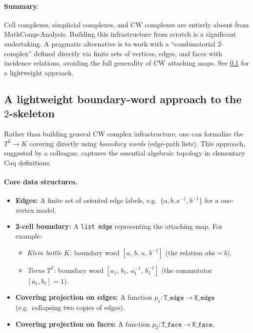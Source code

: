 \documentclass[11pt,a4paper]{article}
\theoremstyle{definition}
\theoremstyle{remark}
\begin{document}
\paragraph{Summary.}
Cell complexes, simplicial complexes, and CW complexes are entirely absent from MathComp-Analysis. Building this infrastructure from scratch is a significant undertaking. A pragmatic alternative is to work with a ``combinatorial \(2\)-complex'' defined directly via finite sets of vertices, edges, and faces with incidence relations, avoiding the full generality of CW attaching maps. See \cref{app:boundary-word} for a lightweight approach.

\subsection{A lightweight boundary-word approach to the \(2\)-skeleton}
\label{app:boundary-word}

Rather than building general CW complex infrastructure, one can formalize the \(T^2\to K\) covering directly using \emph{boundary words} (edge-path lists). This approach, suggested by a colleague, captures the essential algebraic topology in elementary Coq definitions.

\paragraph{Core data structures.}
\begin{itemize}
  \item \textbf{Edges:} A finite set of oriented edge labels, e.g.\ \(\{a, b, a^{-1}, b^{-1}\}\) for a one-vertex model.
  \item \textbf{2-cell boundary:} A \texttt{list edge} representing the attaching map. For example:
  \begin{itemize}
    \item \emph{Klein bottle \(K\):} boundary word \([a,\, b,\, a,\, b^{-1}]\) (the relation \(aba = b\)).
    \item \emph{Torus \(T^2\):} boundary word \([a_1,\, b_1,\, a_1^{-1},\, b_1^{-1}]\) (the commutator \([a_1,b_1]=1\)).
  \end{itemize}
  \item \textbf{Covering projection on edges:} A function \(p_1:\texttt{T\_edge}\to\texttt{K\_edge}\) (e.g.\ collapsing two copies of edges).
  \item \textbf{Covering projection on faces:} A function \(p_2:\texttt{T\_face}\to\texttt{K\_face}\).
\end{itemize}
\end{document}
